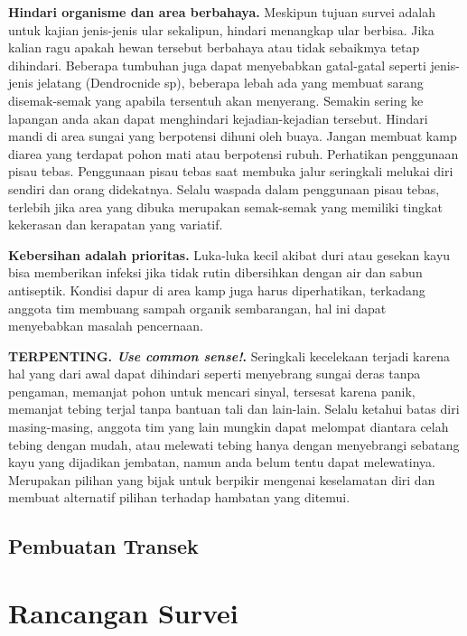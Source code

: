 \documentclass[
  oneside]{book}
\begin{document}
\textbf{Hindari organisme dan area berbahaya.} Meskipun tujuan survei adalah untuk kajian jenis-jenis ular sekalipun, hindari menangkap ular berbisa. Jika kalian ragu apakah hewan tersebut berbahaya atau tidak sebaikmya tetap dihindari. Beberapa tumbuhan juga dapat menyebabkan gatal-gatal seperti jenis-jenis jelatang (Dendrocnide sp), beberapa lebah ada yang membuat sarang disemak-semak yang apabila tersentuh akan menyerang. Semakin sering ke lapangan anda akan dapat menghindari kejadian-kejadian tersebut. Hindari mandi di area sungai yang berpotensi dihuni oleh buaya. Jangan membuat kamp diarea yang terdapat pohon mati atau berpotensi rubuh.
Perhatikan penggunaan pisau tebas. Penggunaan pisau tebas saat membuka jalur seringkali melukai diri sendiri dan orang didekatnya. Selalu waspada dalam penggunaan pisau tebas, terlebih jika area yang dibuka merupakan semak-semak yang memiliki tingkat kekerasan dan kerapatan yang variatif.

\textbf{Kebersihan adalah prioritas.} Luka-luka kecil akibat duri atau gesekan kayu bisa memberikan infeksi jika tidak rutin dibersihkan dengan air dan sabun antiseptik. Kondisi dapur di area kamp juga harus diperhatikan, terkadang anggota tim membuang sampah organik sembarangan, hal ini dapat menyebabkan masalah pencernaan.

\textbf{TERPENTING. \emph{Use common sense!}.} Seringkali kecelekaan terjadi karena hal yang dari awal dapat dihindari seperti menyebrang sungai deras tanpa pengaman, memanjat pohon untuk mencari sinyal, tersesat karena panik, memanjat tebing terjal tanpa bantuan tali dan lain-lain. Selalu ketahui batas diri masing-masing, anggota tim yang lain mungkin dapat melompat diantara celah tebing dengan mudah, atau melewati tebing hanya dengan menyebrangi sebatang kayu yang dijadikan jembatan, namun anda belum tentu dapat melewatinya. Merupakan pilihan yang bijak untuk berpikir mengenai keselamatan diri dan membuat alternatif pilihan terhadap hambatan yang ditemui.

\hypertarget{pembuatan-transek}{%
\section*{Pembuatan Transek}\label{pembuatan-transek}}

\hypertarget{rancangan-survei}{%
\chapter*{Rancangan Survei}\label{rancangan-survei}}
\end{document}
